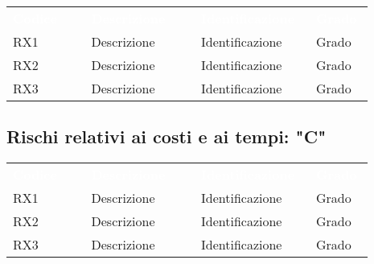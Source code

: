 {\renewcommand{\arraystretch}{1.5}
\begin{tabular}{  >{\centering}p{0.20\linewidth} | >{\centering}p{0.28\linewidth} | >{\centering}p{0.28\linewidth} | >{\centering}p{0.13\linewidth}  }
	\rowcolor[RGB]{33, 73, 50}
	\textcolor{white}{\textbf{Codice}} & \textcolor{white}
	{\textbf{Descrizione}} & \textcolor{white}{\textbf{Identificazione}} & \textcolor{white}{\textbf{Grado}}\tabularnewline
	\rowcolor[RGB]{216, 235, 171}
	RX1 & Descrizione & Identificazione & Grado\tabularnewline
	\rowcolor[RGB]{233, 245, 206}
	RX2 & Descrizione & Identificazione & Grado\tabularnewline
	\rowcolor[RGB]{216, 235, 171}
	RX3 & Descrizione & Identificazione & Grado\tabularnewline
	
\end{tabular}	
}

\subsection{Rischi relativi ai costi e ai tempi: "C"}

{\renewcommand{\arraystretch}{1.5}
\begin{tabular}{  >{\centering}p{0.20\linewidth} | >{\centering}p{0.28\linewidth} | >{\centering}p{0.28\linewidth} | >{\centering}p{0.13\linewidth}  }
	\rowcolor[RGB]{33, 73, 50}
	\textcolor{white}{\textbf{Codice}} & \textcolor{white}
	{\textbf{Descrizione}} & \textcolor{white}{\textbf{Identificazione}} & \textcolor{white}{\textbf{Grado}}\tabularnewline
	\rowcolor[RGB]{216, 235, 171}
	RX1 & Descrizione & Identificazione & Grado\tabularnewline
	\rowcolor[RGB]{233, 245, 206}
	RX2 & Descrizione & Identificazione & Grado\tabularnewline
	\rowcolor[RGB]{216, 235, 171}
	RX3 & Descrizione & Identificazione & Grado\tabularnewline
	
\end{tabular}	
}

